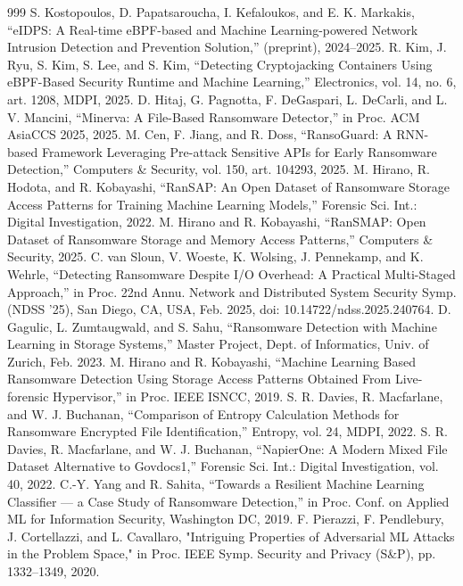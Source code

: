 \begin{thebibliography}{999}
 S. Kostopoulos, D. Papatsaroucha, I. Kefaloukos, and E. K. Markakis, ``eIDPS: A Real-time eBPF-based and Machine Learning-powered Network Intrusion Detection and Prevention Solution,'' (preprint), 2024--2025.
 R. Kim, J. Ryu, S. Kim, S. Lee, and S. Kim, ``Detecting Cryptojacking Containers Using eBPF-Based Security Runtime and Machine Learning,'' Electronics, vol. 14, no. 6, art. 1208, MDPI, 2025.
 D. Hitaj, G. Pagnotta, F. DeGaspari, L. DeCarli, and L. V. Mancini, ``Minerva: A File-Based Ransomware Detector,'' in Proc. ACM AsiaCCS 2025, 2025.
 M. Cen, F. Jiang, and R. Doss, ``RansoGuard: A RNN-based Framework Leveraging Pre-attack Sensitive APIs for Early Ransomware Detection,'' Computers \& Security, vol. 150, art. 104293, 2025.
 M. Hirano, R. Hodota, and R. Kobayashi, ``RanSAP: An Open Dataset of Ransomware Storage Access Patterns for Training Machine Learning Models,'' Forensic Sci. Int.: Digital Investigation, 2022.
 M. Hirano and R. Kobayashi, ``RanSMAP: Open Dataset of Ransomware Storage and Memory Access Patterns,'' Computers \& Security, 2025.
 C. van Sloun, V. Woeste, K. Wolsing, J. Pennekamp, and K. Wehrle, ``Detecting Ransomware Despite I/\allowbreak{}O Overhead: A Practical Multi-Staged Approach,'' in Proc. 22nd Annu. Network and Distributed System Security Symp. (NDSS '25), San Diego, CA, USA, Feb. 2025, doi: 10.14722/\allowbreak{}ndss.2025.240764.
 D. Gagulic, L. Zumtaugwald, and S. Sahu, ``Ransomware Detection with Machine Learning in Storage Systems,'' Master Project, Dept. of Informatics, Univ. of Zurich, Feb. 2023.
 M. Hirano and R. Kobayashi, ``Machine Learning Based Ransomware Detection Using Storage Access Patterns Obtained From Live-forensic Hypervisor,'' in Proc. IEEE ISNCC, 2019.
 S. R. Davies, R. Macfarlane, and W. J. Buchanan, ``Comparison of Entropy Calculation Methods for Ransomware Encrypted File Identification,'' Entropy, vol. 24, MDPI, 2022.
 S. R. Davies, R. Macfarlane, and W. J. Buchanan, ``NapierOne: A Modern Mixed File Dataset Alternative to Govdocs1,'' Forensic Sci. Int.: Digital Investigation, vol. 40, 2022.
 C.-Y. Yang and R. Sahita, ``Towards a Resilient Machine Learning Classifier --- a Case Study of Ransomware Detection,'' in Proc. Conf. on Applied ML for Information Security, Washington DC, 2019.
 F. Pierazzi, F. Pendlebury, J. Cortellazzi, and L. Cavallaro, "Intriguing Properties of Adversarial ML Attacks in the Problem Space," in Proc. IEEE Symp. Security and Privacy (S\&P), pp. 1332--1349, 2020.

\end{thebibliography}
